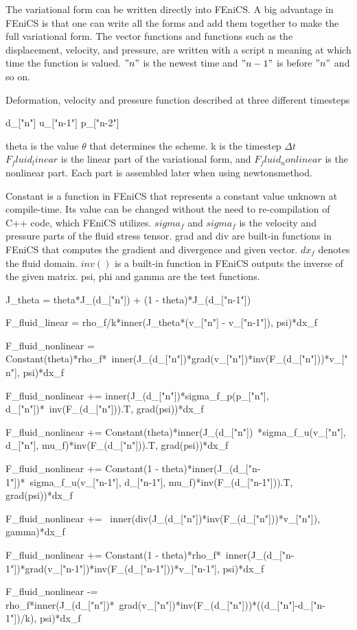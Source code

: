 The variational form can be written directly into FEniCS. A big advantage in FEniCS is that one can write all the forms and add them together to make the full variational form.
The vector functions and functions such as the displacement, velocity, and pressure, are written with a script n meaning at which time the function is valued. $"n"$ is the newest time and $"n-1"$ is before $"n"$ and so on.
\begin{python}\caption{Deformation, velocity and pressure function described at three different timesteps }
d_["n"]  
u_["n-1"]
p_["n-2"]
\end{python}

theta is the value $\theta$ that determines the scheme.
k is the timestep $\Delta t$\\
$F_fluid_linear$ is the linear part of the variational form, and $F_fluid_nonlinear$ is the nonlinear part. Each part is assembled later when using newtonsmethod. 

Constant is a function in FEniCS that represents a constant value unknown at compile-time. Its value can be changed without the need to re-compilation of C++ code, which FEniCS utilizes.
$sigma_f$ and $sigma_f $ is the velocity and pressure parts of the fluid stress tensor.
grad and div are built-in functions in FEniCS that computes the gradient and divergence and given vector.
$dx_f$ denotes the fluid domain. 
$inv()$ is a built-in function in FEniCS outputs the inverse of the given matrix. 
psi, phi and gamma are the test functions.

\begin{python}
J_theta = theta*J_(d_["n"]) + (1 - theta)*J_(d_["n-1"])

F_fluid_linear = rho_f/k*inner(J_theta*(v_["n"] - v_["n-1"]), psi)*dx_f

F_fluid_nonlinear =  Constant(theta)*rho_f*\
inner(J_(d_["n"])*grad(v_["n"])*inv(F_(d_["n"]))*v_["n"], psi)*dx_f

F_fluid_nonlinear += inner(J_(d_["n"])*sigma_f_p(p_["n"], d_["n"])*\
inv(F_(d_["n"])).T, grad(psi))*dx_f

F_fluid_nonlinear += Constant(theta)*inner(J_(d_["n"])\
*sigma_f_u(v_["n"], d_["n"], mu_f)*inv(F_(d_["n"])).T, grad(psi))*dx_f

F_fluid_nonlinear += Constant(1 - theta)*inner(J_(d_["n-1"])*\
sigma_f_u(v_["n-1"], d_["n-1"], mu_f)*inv(F_(d_["n-1"])).T, grad(psi))*dx_f

F_fluid_nonlinear += \
inner(div(J_(d_["n"])*inv(F_(d_["n"]))*v_["n"]), gamma)*dx_f

F_fluid_nonlinear += Constant(1 - theta)*rho_f*\
inner(J_(d_["n-1"])*grad(v_["n-1"])*inv(F_(d_["n-1"]))*v_["n-1"], psi)*dx_f

F_fluid_nonlinear -= rho_f*inner(J_(d_["n"])*\
grad(v_["n"])*inv(F_(d_["n"]))*((d_["n"]-d_["n-1"])/k), psi)*dx_f
\end{python}


